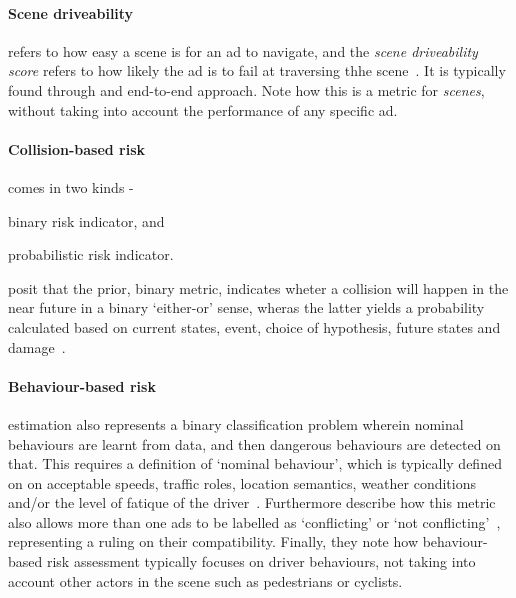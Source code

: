 \paragraph{Scene driveability} refers to how easy a scene is for an
\acrshort{ad} to navigate, and the \textit{scene driveability score} refers to
how likely the \acrlong{ad} is to fail at traversing thhe
scene~\cite[3140]{safeToDrive}. It is typically found through and end-to-end
approach. Note how this is a metric for \textit{scenes}, without taking into
account the performance of any specific \acrshort{ad}.

\paragraph{Collision-based risk} comes in two kinds - \begin{inparaenum}
    \item binary risk indicator, and
    \item probabilistic risk indicator.
\end{inparaenum} \citeauthor{safeToDrive} posit that the prior, binary metric, indicates wheter a
collision will happen in the near future in a binary `either-or' sense, wheras the latter yields a
probability calculated based on current states, event, choice of hypothesis, future states and
damage~\cite[3140]{safeToDrive}.

\paragraph{Behaviour-based risk} estimation also represents a binary classification problem wherein
nominal behaviours are learnt from data, and then dangerous behaviours are detected on that. This
requires a definition of `nominal behaviour', which is typically defined on on acceptable speeds,
traffic roles, location semantics, weather conditions and/or the level of fatique of the
driver~\cite[3140]{safeToDrive}. Furthermore \citeauthor{safeToDrive} describe how this metric also
allows more than one \acrshort{ads} to be labelled as `conflicting' or `not
conflicting'~\cite[3140]{safeToDrive}, representing a ruling on their compatibility. Finally, they
note how behaviour-based risk assessment typically focuses on driver behaviours, not taking into
account other actors in the scene such as pedestrians or cyclists.



